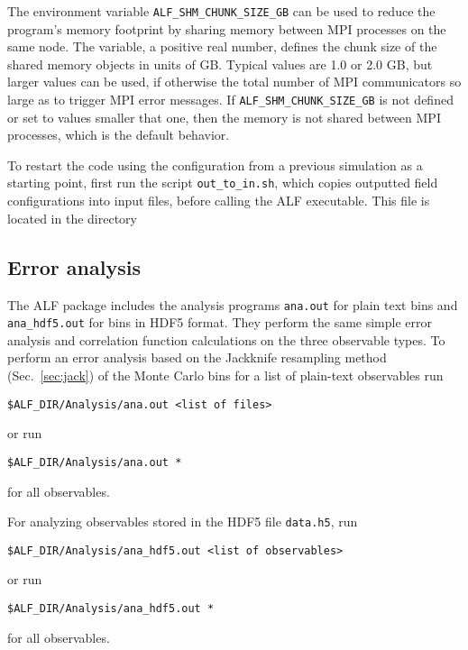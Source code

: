 \noindent The environment variable \texttt{ALF\_SHM\_CHUNK\_SIZE\_GB} can be used to reduce the program's memory footprint by sharing memory between MPI processes on the same node. The variable, a positive real number, defines the chunk size of the shared memory objects in units of GB.
Typical values are 1.0 or 2.0 GB, but larger values can be used, if otherwise the total number of MPI communicators so large as to trigger MPI error messages.
If \texttt{ALF\_SHM\_CHUNK\_SIZE\_GB} is not defined or set to values smaller that one, then the memory is not shared between MPI processes, which is the default behavior.

To restart the code using the configuration from a previous simulation as a starting point, first run the script \texttt{out\_to\_in.sh}, which copies outputted field configurations into input files, before calling the ALF executable.   This file is located in the  directory 

%
\subsection{Error analysis}\label{sec:analysis}
%

The ALF package includes the analysis programs \texttt{ana.out} for plain text bins and \texttt{ana\_hdf5.out} for bins in HDF5 format. They perform the same simple error analysis and correlation function calculations on the three observable types. To perform an error analysis based on the Jackknife resampling method~\cite{efron1981} (Sec.~\ref{sec:jack}) of the Monte Carlo bins for a list of plain-text observables run
\begin{lstlisting}[style=bash]
$ALF_DIR/Analysis/ana.out <list of files>
\end{lstlisting}
or run
\begin{lstlisting}[style=bash]
$ALF_DIR/Analysis/ana.out *
\end{lstlisting}
for all observables.

For analyzing observables stored in the HDF5 file \texttt{data.h5}, run
\begin{lstlisting}[style=bash]
$ALF_DIR/Analysis/ana_hdf5.out <list of observables>
\end{lstlisting}
or run
\begin{lstlisting}[style=bash]
$ALF_DIR/Analysis/ana_hdf5.out *
\end{lstlisting}
for all observables.

